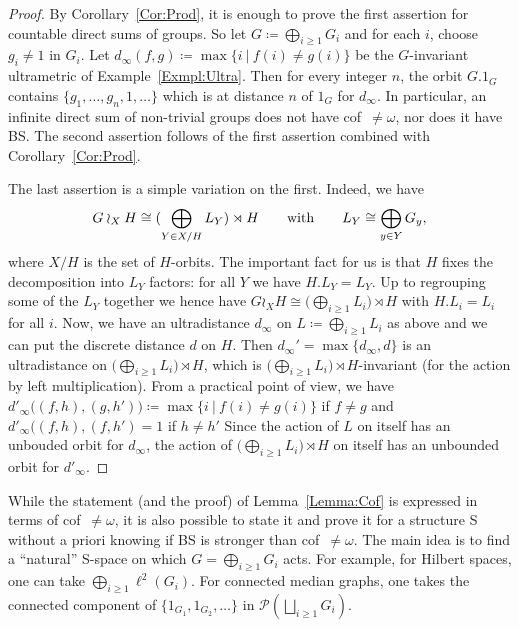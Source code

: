 \documentclass[a4paper]{article}
\newcounter{mycomment}
\newcommand{\mycomment}[2][]{\refstepcounter{mycomment}{\todo[color={green!33},size=\small]{\textbf{Commentaire [\uppercase{#1}\themycomment]:}~#2}}}
\theoremstyle{definition}
\newcommand{\setst}[2]{\{#1\ |\ #2\}}
\newcommand*{\powerset}[1]{\mathcal P(#1)}
\begin{document}
\begin{proof}
By Corollary~\ref{Cor:Prod}, it is enough to prove the first assertion for countable direct sums of groups.
So let $G\coloneqq \bigoplus_{i\geq 1}G_i$ and for each $i$, choose $g_i\neq 1$ in $G_i$.
Let $d_\infty(f,g)\coloneqq\max\setst{i}{f(i)\neq g(i)}$ be the $G$-invariant ultrametric of Example~\ref{Exmpl:Ultra}.
Then for every integer $n$, the orbit $G.1_G$ contains $\{g_1,\dots,g_n,1,\dots\}$ which is at distance $n$ of $1_G$ for $d_\infty$.
In particular, an infinite direct sum of non-trivial groups does not have cof~$\neq\omega$, nor does it have BS.
The second assertion follows of the first assertion combined with Corollary~\ref{Cor:Prod}.

The last assertion is a simple variation on the first.
Indeed, we have
\[
	G\wr_XH\cong(\bigoplus_{Y\in X/H}L_Y)\rtimes H\qquad\textnormal{with}\qquad L_Y\cong\bigoplus_{y\in Y}G_y,
\]
where $X/H$ is the set of $H$-orbits.
The important fact for us is that $H$ fixes the decomposition into $L_Y$ factors: for all $Y$ we have $H.L_Y=L_Y$.
Up to regrouping some of the $L_Y$ together we hence have $G\wr_XH\cong\bigl(\bigoplus_{i\geq 1}L_i\bigr)\rtimes H$ with $H.L_i=L_i$ for all $i$.
Now, we have an ultradistance $d_\infty$ on $L\coloneqq\bigoplus_{i\geq 1}L_i$ as above and we can put the discrete distance $d$ on $H$.
Then $d_\infty'=\max\{d_\infty,d\}$ is an ultradistance on $\bigl(\bigoplus_{i\geq 1}L_i\bigr)\rtimes H$, which is $\bigl(\bigoplus_{i\geq 1}L_i\bigr)\rtimes H$-invariant (for the action by left multiplication).
From a practical point of view, we have $d'_\infty\bigl((f,h),(g,h')\bigr)\coloneqq\max\setst{i}{f(i)\neq g(i)}$ if $f\neq g$ and $d'_\infty\bigl((f,h),(f,h')=1$ if $h\neq h'$
Since the action of $L$ on itself has an unbouded orbit for $d_\infty$, the action of $\bigl(\bigoplus_{i\geq 1}L_i\bigr)\rtimes H$ on itself has an unbounded orbit for $d'_\infty$.
\end{proof}
%
%
While the statement (and the proof) of Lemma~\ref{Lemma:Cof} is expressed in terms of cof~$\neq\omega$, it is also possible to state it and prove it for a structure S without a priori knowing if BS is stronger than cof~$\neq\omega$.
The main idea is to find a ``natural'' S-space on which $G=\bigoplus_{i\geq 1}G_i$ acts. For example, for Hilbert spaces, one can take $\bigoplus_{i\geq 1}\ell^2(G_i)$. For connected median graphs, one takes the connected component of $\{1_{G_1},1_{G_2},\dots\}$ in $\powerset{\bigsqcup_{i\geq 1} G_i}$.
\end{document}
